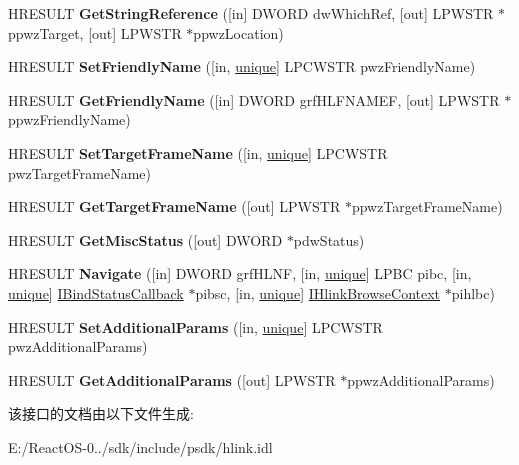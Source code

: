 \begin{DoxyCompactItemize}
H\+R\+E\+S\+U\+LT {\bfseries Get\+String\+Reference} (\mbox{[}in\mbox{]} D\+W\+O\+RD dw\+Which\+Ref, \mbox{[}out\mbox{]} L\+P\+W\+S\+TR $\ast$ppwz\+Target, \mbox{[}out\mbox{]} L\+P\+W\+S\+TR $\ast$ppwz\+Location)
\item 
\mbox{\label{interface_i_hlink_a08d71b243d7791968428cce9ff0eccc0}} 
H\+R\+E\+S\+U\+LT {\bfseries Set\+Friendly\+Name} (\mbox{[}in, \hyperlink{interfaceunique}{unique}\mbox{]} L\+P\+C\+W\+S\+TR pwz\+Friendly\+Name)
\item 
\mbox{\label{interface_i_hlink_a0f872595c92f39679036506685e610e7}} 
H\+R\+E\+S\+U\+LT {\bfseries Get\+Friendly\+Name} (\mbox{[}in\mbox{]} D\+W\+O\+RD grf\+H\+L\+F\+N\+A\+M\+EF, \mbox{[}out\mbox{]} L\+P\+W\+S\+TR $\ast$ppwz\+Friendly\+Name)
\item 
\mbox{\label{interface_i_hlink_a1b03b3f33fbb90bf0814aef7ec910d71}} 
H\+R\+E\+S\+U\+LT {\bfseries Set\+Target\+Frame\+Name} (\mbox{[}in, \hyperlink{interfaceunique}{unique}\mbox{]} L\+P\+C\+W\+S\+TR pwz\+Target\+Frame\+Name)
\item 
\mbox{\label{interface_i_hlink_a3ebd373a5009179e64717655273495e3}} 
H\+R\+E\+S\+U\+LT {\bfseries Get\+Target\+Frame\+Name} (\mbox{[}out\mbox{]} L\+P\+W\+S\+TR $\ast$ppwz\+Target\+Frame\+Name)
\item 
\mbox{\label{interface_i_hlink_a04b205bc8fa1b2a9d9cb15b8e3857ed6}} 
H\+R\+E\+S\+U\+LT {\bfseries Get\+Misc\+Status} (\mbox{[}out\mbox{]} D\+W\+O\+RD $\ast$pdw\+Status)
\item 
\mbox{\label{interface_i_hlink_a25325458e9e6f3654dd79f23399c93a0}} 
H\+R\+E\+S\+U\+LT {\bfseries Navigate} (\mbox{[}in\mbox{]} D\+W\+O\+RD grf\+H\+L\+NF, \mbox{[}in, \hyperlink{interfaceunique}{unique}\mbox{]} L\+P\+BC pibc, \mbox{[}in, \hyperlink{interfaceunique}{unique}\mbox{]} \hyperlink{interface_i_bind_status_callback}{I\+Bind\+Status\+Callback} $\ast$pibsc, \mbox{[}in, \hyperlink{interfaceunique}{unique}\mbox{]} \hyperlink{interface_i_hlink_browse_context}{I\+Hlink\+Browse\+Context} $\ast$pihlbc)
\item 
\mbox{\label{interface_i_hlink_acbe85e60f058a1307e00aee23922628e}} 
H\+R\+E\+S\+U\+LT {\bfseries Set\+Additional\+Params} (\mbox{[}in, \hyperlink{interfaceunique}{unique}\mbox{]} L\+P\+C\+W\+S\+TR pwz\+Additional\+Params)
\item 
\mbox{\label{interface_i_hlink_abaa5ff5571f98287446f5cd8b72c486a}} 
H\+R\+E\+S\+U\+LT {\bfseries Get\+Additional\+Params} (\mbox{[}out\mbox{]} L\+P\+W\+S\+TR $\ast$ppwz\+Additional\+Params)
\end{DoxyCompactItemize}


该接口的文档由以下文件生成\+:\begin{DoxyCompactItemize}
\item 
E\+:/\+React\+O\+S-\/0../sdk/include/psdk/hlink.\+idl\end{DoxyCompactItemize}
